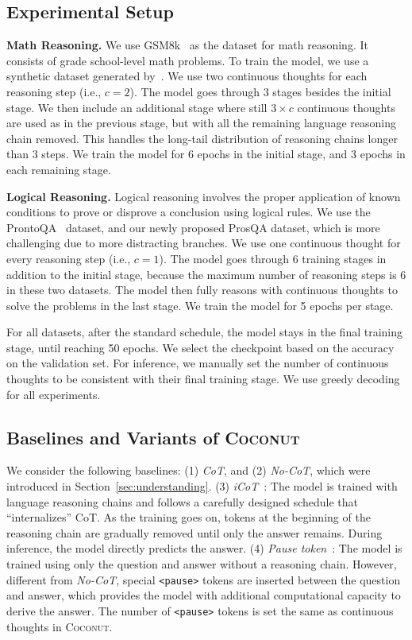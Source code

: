 \documentclass[]{fairmeta}
\newcommand{\ours}{\textsc{Coconut}\xspace}
\begin{document}
\subsection{Experimental Setup}

\noindent\textbf{Math Reasoning.}
We use GSM8k~\citep{cobbe2021training} as the dataset for math reasoning. It consists of grade school-level math problems. To train the model, we use a synthetic dataset generated by~\citet{deng2023implicit}. We use two continuous thoughts for each reasoning step (i.e., $c=2$). The model goes through 3 stages besides the initial stage. We then include an additional stage where still $3\times c$ continuous thoughts are used as in the previous stage, but with all the remaining language reasoning chain removed. This handles the long-tail distribution of reasoning chains longer than 3 steps. We train the model for 6 epochs in the initial stage, and 3 epochs in each remaining stage. 

\noindent\textbf{Logical Reasoning.} Logical reasoning involves the proper application of known conditions to prove or disprove a conclusion using logical rules. We use the ProntoQA~\citep{saparov2022language} dataset, and our newly proposed ProsQA dataset, which is more challenging due to more distracting branches. We use one continuous thought for every reasoning step (i.e., $c=1$). The model goes through 6 training stages in addition to the initial stage, because the maximum number of reasoning steps is 6 in these two datasets. The model then fully reasons with continuous thoughts to solve the problems in the last stage. We train the model for 5 epochs per stage.

For all datasets, after the standard schedule, the model stays in the final training stage, until reaching 50 epochs. We select the checkpoint based on the accuracy on the validation set. For inference, we manually set the number of continuous thoughts to be consistent with their final training stage. We use greedy decoding for all experiments. 


\subsection{Baselines and Variants of \ours}
We consider the following baselines: (1) \textit{CoT}, and (2) \textit{No-CoT}, which were introduced in Section~\ref{sec:understanding}. (3) \textit{iCoT}~\citep{deng2024explicit}: The model is trained with language reasoning chains and follows a carefully designed schedule that ``internalizes'' CoT. As the training goes on, tokens at the beginning of the reasoning chain are gradually removed until only the answer remains. During inference, the model directly predicts the answer. (4) \textit{Pause token}~\citep{goyal2023think}: The model is trained using only the question and answer without a reasoning chain. However, different from \textit{No-CoT}, special \texttt{<pause>} tokens are inserted between the question and answer, which provides the model with additional computational capacity to derive the answer. The number of \texttt{<pause>} tokens is set the same as continuous thoughts in \ours. 
\end{document}
